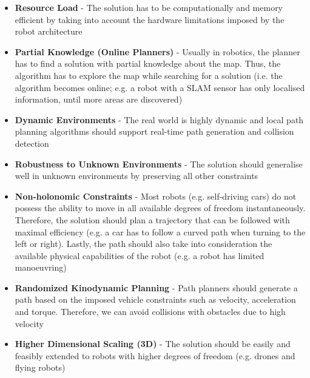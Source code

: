 \begin{itemize}
    \item \textbf{Resource Load} - The solution has to be computationally and memory efficient by taking into account the hardware limitations imposed by the robot architecture
    \item \textbf{Partial Knowledge (Online Planners)} - Usually in robotics, the planner has to find a solution with partial knowledge about the map. Thus, the algorithm has to explore the map while searching for a solution (i.e. the algorithm becomes online; e.g. a robot with a SLAM sensor has only localised information, until more areas are discovered)
    \item \textbf{Dynamic Environments} - The real world is highly dynamic and local path planning algorithms should support real-time path generation and collision detection
    \item \textbf{Robustness to Unknown Environments} - The solution should generalise well in unknown environments by preserving all other constraints
    \item \textbf{Non-holonomic Constraints} - Most robots (e.g. self-driving cars) do not possess the ability to move in all available degrees of freedom instantaneously. Therefore, the solution should plan a trajectory that can be followed with maximal efficiency (e.g. a car has to follow a curved path when turning to the left or right). Lastly, the path should also take into consideration the available physical capabilities of the robot (e.g. a robot has limited manoeuvring)
    \item \textbf{Randomized Kinodynamic Planning} - Path planners should generate a path based on the imposed vehicle constraints such as velocity, acceleration and torque. Therefore, we can avoid collisions with obstacles due to high velocity
    \item \textbf{Higher Dimensional Scaling (3D)} - The solution should be easily and feasibly extended to robots with higher degrees of freedom (e.g. drones and flying robots)
\end{itemize}



